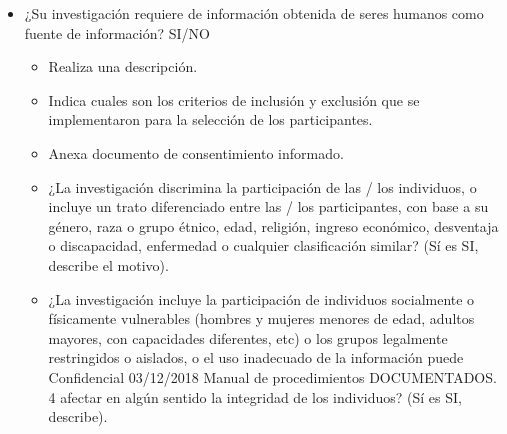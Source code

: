\begin{enumerate}
\begin{itemize}
		\item ¿Su investigación requiere de información obtenida de seres humanos como fuente de información? SI/NO
		\begin{itemize}
			\item Realiza una descripción.
			\item Indica cuales son los criterios de inclusión y exclusión que se implementaron para la selección de los participantes.
			\item Anexa documento de consentimiento informado.
			\item ¿La investigación discrimina la participación de las / los individuos, o incluye un trato diferenciado entre las / los participantes, con base a su género, raza o grupo étnico, edad, religión, ingreso económico, desventaja o discapacidad, enfermedad o cualquier clasificación similar? (Sí es SI, describe el motivo).
			\item ¿La investigación incluye la participación de individuos socialmente o físicamente vulnerables (hombres y mujeres menores de edad, adultos mayores, con capacidades diferentes, etc) o los grupos legalmente restringidos o aislados, o el uso inadecuado de la información puede Confidencial 03/12/2018 Manual de procedimientos DOCUMENTADOS. 4 afectar en algún sentido la integridad de los individuos? (Sí es SI, describe).
		\end{itemize}
	\end{itemize}

\end{enumerate}

